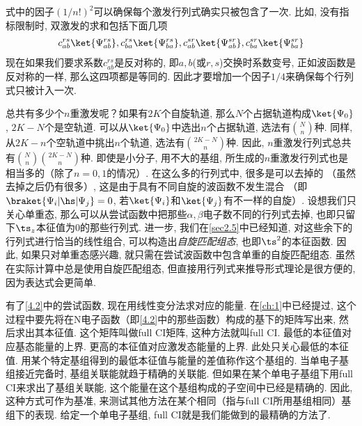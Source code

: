 式中的因子$(1/n!)^2$可以确保每个激发行列式确实只被包含了一次. 
比如, 
没有指标限制时, 
双激发的求和包括下面几项
\begin{align*}
c_{ab}^{rs}\ket{\Psi_{ab}^{rs}}, 
c_{ba}^{rs}\ket{\Psi_{ba}^{rs}}, 
c_{ab}^{sr}\ket{\Psi_{ab}^{sr}},
c_{ba}^{sr}\ket{\Psi_{ba}^{sr}}
\end{align*}
现在如果我们要求系数$c_{ab}^{rs}$是反对称的, 
即$a,b$(或$r,s$)交换时系数变号, 
正如波函数是反对称的一样, 
那么这四项都是等同的. 
因此才要增加一个因子$1/4$来确保每个行列式只被计入一次.


总共有多少个$n$重激发呢？如果有$2K$个自旋轨道, 
那么$N$个占据轨道构成$\ket{\Psi_0}$, 
$2K-N$个是空轨道. 
可以从$\ket{\Psi_0}$中选出$n$个占据轨道, 
选法有$\binom{N}{n}$种. 
同样, 
从$2K-n$个空轨道中挑出$n$个轨道, 
选法有$\binom{2K-N}{n}$种. 
因此, 
$n$重激发行列式总共有$\binom{N}{n}\binom{2K-N}{n}$种. 
即使是小分子, 
用不大的基组, 
所生成的$n$重激发行列式也是相当多的（除了$n=0,1$的情况）. 
在这么多的行列式中, 
很多是可以去掉的 （虽然去掉之后仍有很多）,
这是由于具有不同自旋的波函数不发生混合 （即$\braket{\Psi_i|\hs|\Psi_j}=0$, 
若$\ket{\Psi_i}$和$\ket{\Psi_j}$有不一样的自旋）. 
设想我们只关心单重态, 
那么可以从尝试函数中把那些$\alpha,\beta$电子数不同的行列式去掉, 
也即只留下$\ts_z$本征值为0的那些行列式. 
进一步, 
我们在\autoref{sec2.5}中已经知道, 
对这些余下的行列式进行恰当的线性组合, 
可以构造出\emph{自旋匹配组态}, 
也即$\ts^2$的本征函数. 
因此, 
如果只对单重态感兴趣, 
就只需在尝试波函数中包含单重的自旋匹配组态. 
虽然在实际计算中总是使用自旋匹配组态, 
但直接用行列式来推导形式理论是很方便的, 
因为表达式会更简单.


有了\autoref{4.2}中的尝试函数, 
现在用线性变分法求对应的能量. 
在\autoref{ch:1}中已经提过, 
这个过程中要先将\ha 在N电子函数（即\autoref{4.2}中的那些函数）构成的基下的矩阵写出来, 
然后求出其本征值. 
这个矩阵叫做full CI矩阵, 
这种方法就叫full CI. 
最低的本征值对应基态能量的上界. 
更高的本征值对应激发态能量的上界. 
此处只关心最低的本征值. 
用某个特定基组得到的最低本征值与\hft 能量的差值称作这个基组的. 
当单电子基组接近完备时, 
基组关联能就趋于精确的关联能. 
但如果在某个单电子基组下用full CI来求出了基组关联能, 
这个能量在这个基组构成的子空间中已经是精确的. 
因此, 
这种方式可作为基准, 
来测试其他方法在某个相同（指与full CI所用基组相同）基组下的表现. 
给定一个单电子基组, 
full CI就是我们能做到的最精确的方法了.


